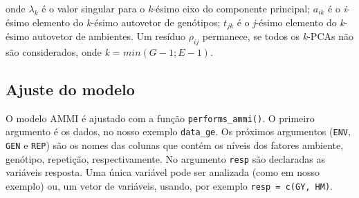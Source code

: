 \documentclass[
]{book}
\begin{document}
onde \({\lambda_k}\) é o valor singular para o \emph{k}-ésimo eixo do componente principal; \(a_{ik}\) é o \emph{i}-ésimo elemento do \emph{k}-ésimo autovetor de genótipos; \(t_{jk}\) é o \emph{j}-ésimo elemento do \emph{k}-ésimo autovetor de ambientes. Um resíduo \(\rho _{ij}\) permanece, se todos os \emph{k}-PCAs não são considerados, onde \emph{k} = \(min(G-1; E-1)\).

\hypertarget{ajuste-do-modelo}{%
\subsection{Ajuste do modelo}\label{ajuste-do-modelo}}

O modelo AMMI é ajustado com a função \texttt{performs\_ammi()}. O primeiro argumento é os dados, no nosso exemplo \texttt{data\_ge}. Os próximos argumentos (\texttt{ENV}, \texttt{GEN} e \texttt{REP}) são os nomes das colunas que contém os níveis dos fatores ambiente, genótipo, repetição, respectivamente. No argumento \texttt{resp} são declaradas as variáveis resposta. Uma única variável pode ser analizada (como em nosso exemplo) ou, um vetor de variáveis, usando, por exemplo \texttt{resp\ =\ c(GY,\ HM)}.
\end{document}
